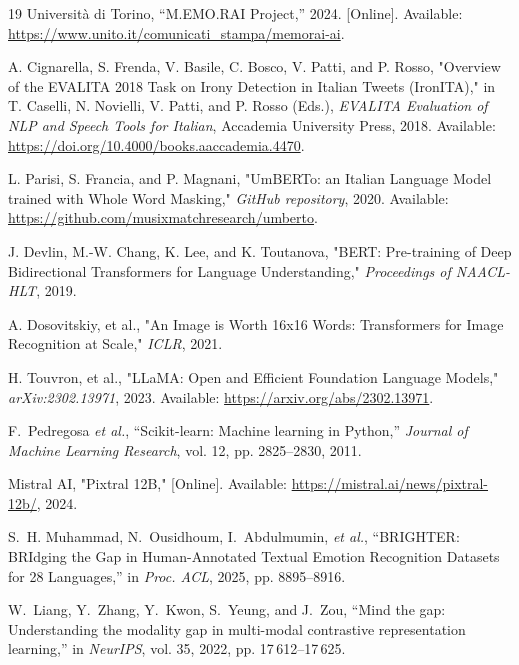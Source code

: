 \documentclass[letterpaper,journal]{IEEEtran}
\begin{document}
\begin{thebibliography}{19}
 Universit\`a di Torino, ``M.EMO.RAI Project,'' 2024. [Online]. Available: \url{https://www.unito.it/comunicati_stampa/memorai-ai}.

 A. Cignarella, S. Frenda, V. Basile, C. Bosco, V. Patti, and P. Rosso, "Overview of the EVALITA 2018 Task on Irony Detection in Italian Tweets (IronITA)," in T. Caselli, N. Novielli, V. Patti, and P. Rosso (Eds.), \textit{EVALITA Evaluation of NLP and Speech Tools for Italian}, Accademia University Press, 2018. Available: \url{https://doi.org/10.4000/books.aaccademia.4470}.

 L. Parisi, S. Francia, and P. Magnani, "UmBERTo: an Italian Language Model trained with Whole Word Masking," \textit{GitHub repository}, 2020. Available: \url{https://github.com/musixmatchresearch/umberto}.

 J. Devlin, M.-W. Chang, K. Lee, and K. Toutanova, "BERT: Pre-training of Deep Bidirectional Transformers for Language Understanding," \textit{Proceedings of NAACL-HLT}, 2019.

 A. Dosovitskiy, et al., "An Image is Worth 16x16 Words: Transformers for Image Recognition at Scale," \textit{ICLR}, 2021.

 H. Touvron, et al., "LLaMA: Open and Efficient Foundation Language Models," \textit{arXiv:2302.13971}, 2023. Available: \url{https://arxiv.org/abs/2302.13971}.

 F.~Pedregosa \textit{et al.}, ``Scikit-learn: Machine learning in Python,'' \textit{Journal of Machine Learning Research}, vol. 12, pp. 2825--2830, 2011.

 Mistral AI, "Pixtral 12B," [Online]. Available: \url{https://mistral.ai/news/pixtral-12b/}, 2024.

 S.~H. Muhammad, N.~Ousidhoum, I.~Abdulmumin, \textit{et al.}, ``BRIGHTER: BRIdging the Gap in Human-Annotated Textual Emotion Recognition Datasets for 28 Languages,'' in \textit{Proc. ACL}, 2025, pp. 8895--8916.

 W.~Liang, Y.~Zhang, Y.~Kwon, S.~Yeung, and J.~Zou, ``Mind the gap: Understanding the modality gap in multi-modal contrastive representation learning,'' in \textit{NeurIPS}, vol. 35, 2022, pp. 17\,612--17\,625.

\end{thebibliography}
\end{document}
